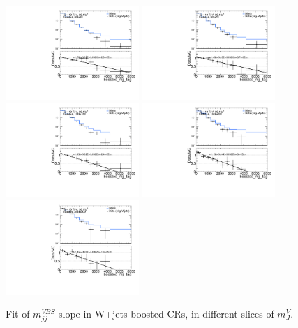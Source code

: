 \begin{figure}[!ht]
	\centering
	\includegraphics[width=0.45\textwidth]{Chapter5/2para_50to60.pdf}
	\includegraphics[width=0.45\textwidth]{Chapter5/2para_60to70.pdf}
	\includegraphics[width=0.45\textwidth]{Chapter5/2para_100to150.pdf}
	\includegraphics[width=0.45\textwidth]{Chapter5/2para_150to200.pdf}
	\includegraphics[width=0.45\textwidth]{Chapter5/2para_200to300.pdf}
	\caption{\label{Fig:mjj_dataMC_fit_boosted} Fit of $m^{VBS}_{jj}$ slope in W+jets boosted CRs, in different slices of $m^{V}_{J}$. }
\end{figure}

